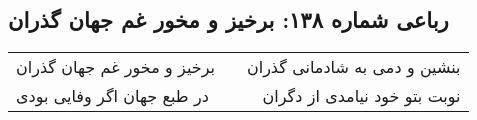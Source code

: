 \begin{center}
\section*{رباعی شماره ۱۳۸: برخیز و مخور غم جهان گذران}
\label{sec:sh138}
\begin{longtable}{l p{0.5cm} r}
برخیز و مخور غم جهان گذران
&&
بنشین و دمی به شادمانی گذران
\\
در طبع جهان اگر وفایی بودی
&&
نوبت بتو خود نیامدی از دگران
\\
\end{longtable}
\end{center}
